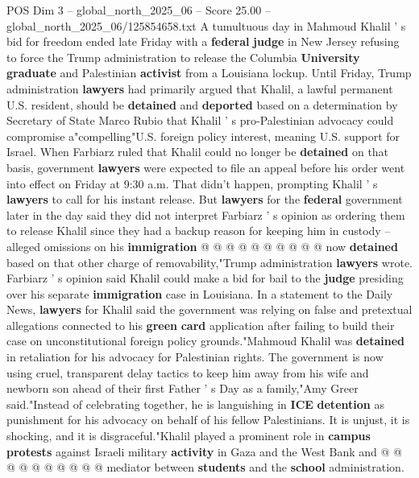 \begin{textsample}{POS Dim 3 – global\_north\_2025\_06 – Score 25.00 – global\_north\_2025\_06/125854658.txt}  \label{ex:f3_pos_097}
A tumultuous day in Mahmoud Khalil ' s bid for freedom ended late Friday with a \textbf{federal} \textbf{judge} in New Jersey refusing to force the Trump administration to release the Columbia \textbf{University} \textbf{graduate} and Palestinian \textbf{activist} from a Louisiana lockup.
Until Friday, Trump administration \textbf{lawyers} had primarily argued that Khalil, a lawful permanent U.S. resident, should be \textbf{detained} and \textbf{deported} based on a determination by Secretary of State Marco Rubio that Khalil ' s pro-Palestinian advocacy could compromise a"compelling"U.S. foreign policy interest, meaning U.S. support for Israel.
When Farbiarz ruled that Khalil could no longer be \textbf{detained} on that basis, government \textbf{lawyers} were expected to file an appeal before his order went into effect on Friday at 9:30 a.m.
That didn't happen, prompting Khalil ' s \textbf{lawyers} to call for his instant release.
But \textbf{lawyers} for the \textbf{federal} government later in the day said they did not interpret Farbiarz ' s opinion as ordering them to release Khalil since they had a backup reason for keeping him in custody -- alleged omissions on his \textbf{immigration} @ @ @ @ @ @ @ @ @ @ now \textbf{detained} based on that other charge of removability,"Trump administration \textbf{lawyers} wrote.
Farbiarz ' s opinion said Khalil could make a bid for bail to the \textbf{judge} presiding over his separate \textbf{immigration} case in Louisiana.
In a statement to the Daily News, \textbf{lawyers} for Khalil said the government was relying on false and pretextual allegations connected to his \textbf{green} \textbf{card} application after failing to build their case on unconstitutional foreign policy grounds."Mahmoud Khalil was \textbf{detained} in retaliation for his advocacy for Palestinian rights.
The government is now using cruel, transparent delay tactics to keep him away from his wife and newborn son ahead of their first Father ' s Day as a family,"Amy Greer said."Instead of celebrating together, he is languishing in \textbf{ICE} \textbf{detention} as punishment for his advocacy on behalf of his fellow Palestinians.
It is unjust, it is shocking, and it is disgraceful."Khalil played a prominent role in \textbf{campus} \textbf{protests} against Israeli military \textbf{activity} in Gaza and the West Bank and @ @ @ @ @ @ @ @ @ @ mediator between \textbf{students} and the \textbf{school} administration.

\end{textsample}
